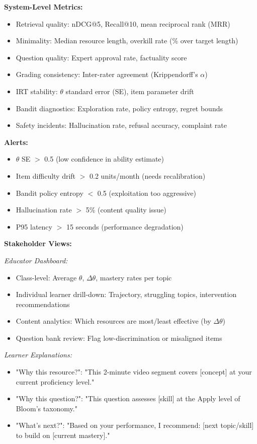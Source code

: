 \documentclass[11pt,letterpaper]{article}
\begin{document}
\textbf{System-Level Metrics:}
\begin{itemize}
\item Retrieval quality: nDCG@5, Recall@10, mean reciprocal rank (MRR)
\item Minimality: Median resource length, overkill rate (\% over target length)
\item Question quality: Expert approval rate, factuality score
\item Grading consistency: Inter-rater agreement (Krippendorff's $\alpha$)
\item IRT stability: $\theta$ standard error (SE), item parameter drift
\item Bandit diagnostics: Exploration rate, policy entropy, regret bounds
\item Safety incidents: Hallucination rate, refusal accuracy, complaint rate
\end{itemize}

\textbf{Alerts:}
\begin{itemize}
\item $\theta$ SE $>$ 0.5 (low confidence in ability estimate)
\item Item difficulty drift $>$ 0.2 units/month (needs recalibration)
\item Bandit policy entropy $<$ 0.5 (exploitation too aggressive)
\item Hallucination rate $>$ 5\% (content quality issue)
\item P95 latency $>$ 15 seconds (performance degradation)
\end{itemize}

\textbf{Stakeholder Views:}

\textit{Educator Dashboard:}
\begin{itemize}
\item Class-level: Average $\theta$, $\Delta\theta$, mastery rates per topic
\item Individual learner drill-down: Trajectory, struggling topics, intervention recommendations
\item Content analytics: Which resources are most/least effective (by $\Delta\theta$)
\item Question bank review: Flag low-discrimination or misaligned items
\end{itemize}

\textit{Learner Explanations:}
\begin{itemize}
\item "Why this resource?": "This 2-minute video segment covers [concept] at your current proficiency level."
\item "Why this question?": "This question assesses [skill] at the Apply level of Bloom's taxonomy."
\item "What's next?": "Based on your performance, I recommend: [next topic/skill] to build on [current mastery]."
\end{itemize}
\end{document}
